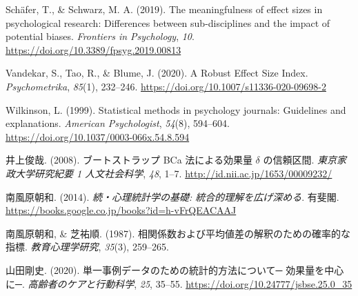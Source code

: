 \documentclass[
  ja=standard, xelatex, base=12pt]{bxjsreport}
\newlength{\cslhangindent}
\newlength{\cslentryspacingunit} %
\newenvironment{CSLReferences}[2] %
 {%
  \setlength{\parindent}{0pt}
  \ifodd #1
  \let\oldpar\par
  \def\par{\hangindent=\cslhangindent\oldpar}
  \fi
  \setlength{\parskip}{#2\cslentryspacingunit}
 }%
 {}
\begin{document}
\begin{CSLReferences}{1}{0}
\leavevmode{}%
Schäfer, T., \& Schwarz, M. A. (2019). The meaningfulness of effect sizes in psychological research: Differences between sub-disciplines and the impact of potential biases. \emph{Frontiers in Psychology}, \emph{10}. \url{https://doi.org/10.3389/fpsyg.2019.00813}

\leavevmode{}%
Vandekar, S., Tao, R., \& Blume, J. (2020). A Robust Effect Size Index. \emph{Psychometrika}, \emph{85}(1), 232--246. \url{https://doi.org/10.1007/s11336-020-09698-2}

\leavevmode{}%
Wilkinson, L. (1999). Statistical methods in psychology journals: Guidelines and explanations. \emph{American Psychologist}, \emph{54}(8), 594--604. \url{https://doi.org/10.1037/0003-066x.54.8.594}

\leavevmode{}%
井上俊哉. (2008). ブートストラップ BCa 法による効果量 \(\delta\) の信頼区間. \emph{東京家政大学研究紀要 1 人文社会科学}, \emph{48}, 1--7. \url{http://id.nii.ac.jp/1653/00009232/}

\leavevmode{}%
南風原朝和. (2014). \emph{続・心理統計学の基礎: 統合的理解を広げ深める}. 有斐閣. \url{https://books.google.co.jp/books?id=h-vFrQEACAAJ}

\leavevmode{}%
南風原朝和, \& 芝祐順. (1987). 相関係数および平均値差の解釈のための確率的な指標. \emph{教育心理学研究}, \emph{35}(3), 259--265.

\leavevmode{}%
山田剛史. (2020). 単一事例データのための統計的方法について─ 効果量を中心に─. \emph{高齢者のケアと行動科学}, \emph{25}, 35--55. \url{https://doi.org/10.24777/jsbse.25.0_35}

\end{CSLReferences}
\end{document}
